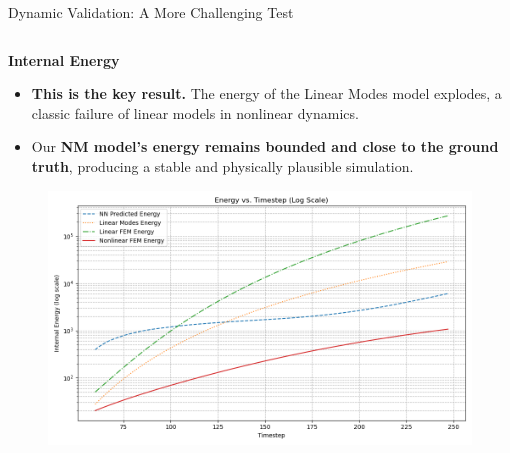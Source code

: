 \documentclass{beamer}
\begin{document}
\begin{frame}{Dynamic Validation: A More Challenging Test}
\begin{columns}[T]
        \begin{column}{0.5\textwidth}
            \textbf{Internal Energy}
            \begin{itemize}
                \item \textbf{This is the key result.} The energy of the Linear Modes model explodes, a classic failure of linear models in nonlinear dynamics.
                \item Our \textbf{NM model's energy remains bounded and close to the ground truth}, producing a stable and physically plausible simulation.
            \end{itemize}
            \begin{figure}
                \includegraphics[width=\textwidth]{Images/beam_dynamic_energy.png}
            \end{figure}
        \end{column}
    \end{columns}
\end{frame}
\end{document}
